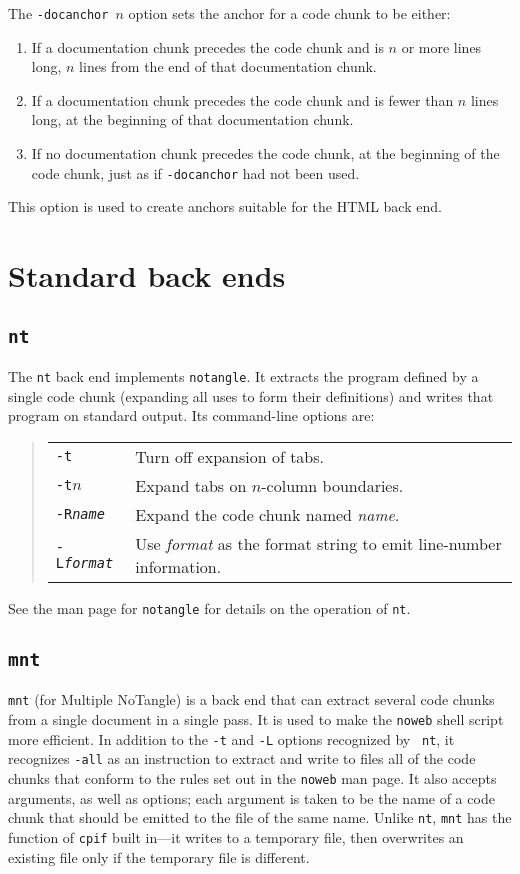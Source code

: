 \documentclass{article}
\begin{document}
The {\tt -docanchor $n$} option sets the anchor for a code chunk to be
either:
\begin{enumerate}
\item
If a documentation chunk precedes the code chunk and is $n$ or more lines long, $n$
lines from the end of that documentation chunk.
\item
If a documentation chunk precedes the code chunk and is fewer than $n$
lines long, at the beginning of that documentation chunk.
\item
If no documentation chunk precedes the code chunk, at the beginning of
the code chunk, just as if {\tt -docanchor} had not been used.
\end{enumerate}
This option is used to create anchors suitable for the HTML back end.


\section{Standard back ends}

\subsection{\tt nt}

The {\tt nt} back end implements {\tt notangle}.
It extracts the program defined by a single code chunk (expanding all
uses to form their definitions) and writes that program on standard
output.
Its command-line options are:
\begin{quote}
\begin{tabularx}{\linewidth}{lX}
\tt -t&Turn off expansion of tabs.\\
\tt -t$n$&Expand tabs on $n$-column boundaries.\\
\tt -R{\rmfamily\textit{name}}&Expand the code chunk named \textit{name}.\\
\tt -L{\rmfamily\textit{format}}&Use \textit{format} as the format string
        to emit line-number information.
\end{tabularx}
\end{quote}
See the man page for {\tt notangle} for details on the operation of
{\tt nt}.


\subsection{\tt mnt}

{\tt mnt} (for Multiple NoTangle) 
is a back end that can extract several code chunks from a
single document in a single pass.  It is used to make the {\tt noweb}
shell script more efficient.
In addition to the {\tt -t} and {\tt -L} options recognized by {\tt
nt}, it recognizes {\tt -all} as an instruction to extract and write
to files all of the code chunks that conform to the rules set out in
the {\tt noweb} man page.
It also accepts arguments, as well as options; each argument is taken
to be the name of a code chunk that should be emitted to the file of
the same name.
Unlike {\tt nt}, {\tt mnt} has the function of {\tt cpif} built
in---it writes to a temporary file, then overwrites an existing file
only if the temporary file is different.
\end{document}

